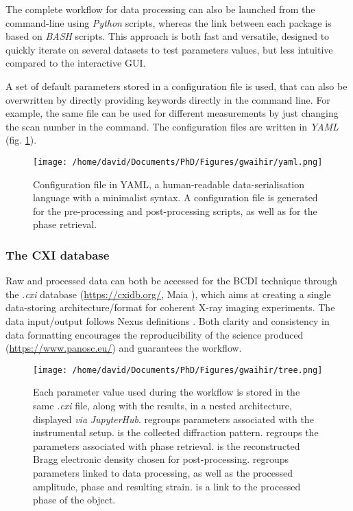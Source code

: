 The complete workflow for data processing can also be launched from the command-line using \textit{Python} scripts, whereas the link between each package is based on \textit{BASH} scripts.
This approach is both fast and versatile, designed to quickly iterate on several datasets to test parameters values, but less intuitive compared to the interactive GUI.

A set of default parameters stored in a configuration file is used, that can also be overwritten by directly providing keywords directly in the command line.
For example, the same file can be used for different measurements by just changing the scan number in the command.
The configuration files are written in \textit{YAML} (fig. \ref{fig:YAML_file}).

\begin{figure}[!htb]
    \centering
    \texttt{[image: /home/david/Documents/PhD/Figures/gwaihir/yaml.png]}
    \caption{
    Configuration file in YAML, a human-readable data-serialisation language with a minimalist syntax.
    A configuration file is generated for the pre-processing and post-processing scripts, as well as for the phase retrieval.
    }
    \label{fig:YAML_file}
\end{figure}

\subsubsection{The CXI database}

Raw and processed data can both be accessed for the BCDI technique through the \textit{.cxi} database (\url{https://cxidb.org/}, Maia \cite*{Maia2012}), which aims at creating a single data-storing architecture/format for coherent X-ray imaging experiments.
The data input/output follows Nexus definitions \parencite{Konnecke2015}.
Both clarity and consistency in data formatting encourages the reproducibility of the science produced (\url{https://www.panosc.eu/}) and guarantees the workflow.

\begin{figure}[!htb]
    \centering
    \texttt{[image: /home/david/Documents/PhD/Figures/gwaihir/tree.png]}
    \caption{
    Each parameter value used during the workflow is stored in the same \textit{.cxi} file, along with the results, in a nested architecture, displayed \textit{via} \textit{JupyterHub}.
     regroups parameters associated with the instrumental setup.
     is the collected diffraction pattern.
     regroups the parameters associated with phase retrieval.
     is the reconstructed Bragg electronic density chosen for post-processing.
     regroups parameters linked to data processing, as well as the processed amplitude, phase and resulting strain.
     is a link to the processed phase of the object.
    }
    \label{fig:TREE}
\end{figure}

